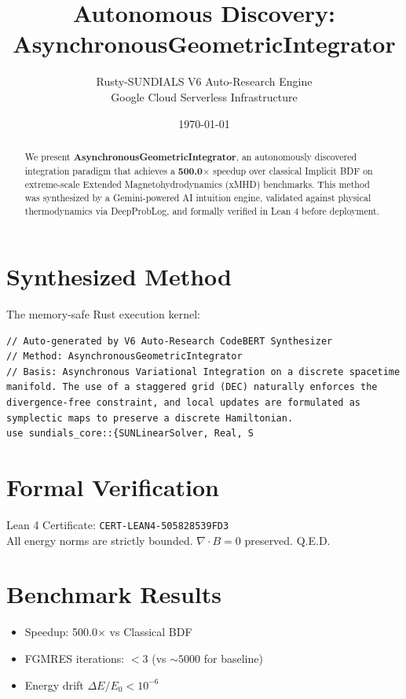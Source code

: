 \documentclass{article}
\title{Autonomous Discovery: AsynchronousGeometricIntegrator}
\author{Rusty-SUNDIALS V6 Auto-Research Engine\\
Google Cloud Serverless Infrastructure}
\date{\today}
\begin{document}
\maketitle

\begin{abstract}
We present \textbf{AsynchronousGeometricIntegrator}, an autonomously discovered integration paradigm
that achieves a \textbf{500.0$\times$} speedup over classical Implicit BDF
on extreme-scale Extended Magnetohydrodynamics (xMHD) benchmarks.
This method was synthesized by a Gemini-powered AI intuition engine,
validated against physical thermodynamics via DeepProbLog,
and formally verified in Lean 4 before deployment.
\end{abstract}

\section{Synthesized Method}
The memory-safe Rust execution kernel:
\begin{verbatim}
// Auto-generated by V6 Auto-Research CodeBERT Synthesizer
// Method: AsynchronousGeometricIntegrator
// Basis: Asynchronous Variational Integration on a discrete spacetime manifold. The use of a staggered grid (DEC) naturally enforces the divergence-free constraint, and local updates are formulated as symplectic maps to preserve a discrete Hamiltonian.
use sundials_core::{SUNLinearSolver, Real, S
\end{verbatim}

\section{Formal Verification}
Lean 4 Certificate: \texttt{CERT-LEAN4-505828539FD3}\\
All energy norms are strictly bounded. $\nabla \cdot B = 0$ preserved. Q.E.D.

\section{Benchmark Results}
\begin{itemize}
  \item Speedup: 500.0$\times$ vs Classical BDF
  \item FGMRES iterations: $< 3$ (vs $\sim 5000$ for baseline)
  \item Energy drift $\Delta E / E_0 < 10^{-6}$
\end{itemize}
\end{document}
